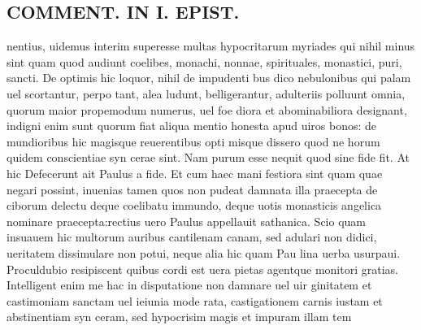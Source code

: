 \documentclass{article}
\begin{document}
\begin{pages}
\section*{COMMENT. IN I. EPIST. }\pstart nentius, uidemus interim superesse multas hypocritarum myriades qui nihil minus sint quam quod audiunt coelibes, monachi, nonnae, spirituales, monastici, puri, sancti. De optimis hic loquor, nihil de impudenti bus dico nebulonibus qui palam uel scortantur, perpo tant, alea ludunt, belligerantur, adulteriis polluunt omnia, quorum maior propemodum numerus, uel foe diora et abominabiliora designant, indigni enim sunt quorum fiat aliqua mentio honesta apud uiros bonos: de mundioribus hic magisque reuerentibus opti misque dissero quod ne horum quidem conscientiae syn cerae sint. Nam purum esse nequit quod sine fide fit. At hic Defecerunt ait Paulus a fide. Et cum haec mani festiora sint quam quae negari possint, inuenias tamen quos non pudeat damnata illa praecepta de ciborum delectu deque coelibatu immundo, deque uotis monasticis angelica nominare praecepta:rectius uero Paulus appellauit sathanica. Scio quam insuauem hic multorum auribus cantilenam canam, sed adulari non didici, ueritatem dissimulare non potui, neque alia hic quam Pau lina uerba usurpaui. Proculdubio resipiscent quibus cordi est uera pietas agentque monitori gratias. Intelligent enim me hac in disputatione non damnare uel uir ginitatem et castimoniam sanctam uel ieiunia mode rata, castigationem carnis iustam et abstinentiam syn ceram, sed hypocrisim magis et impuram illam tem\pend

\end{pages}
\end{document}
